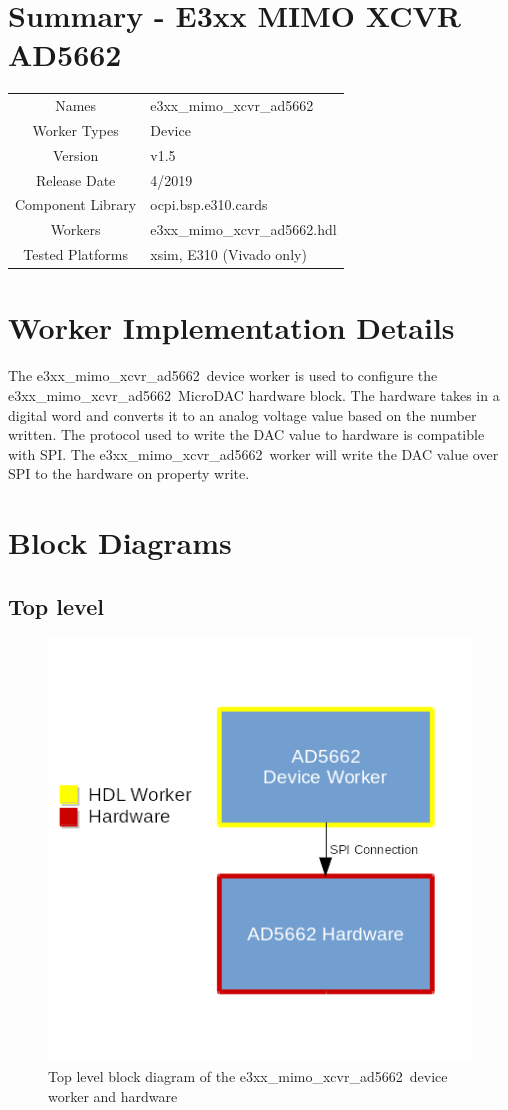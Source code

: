 \documentclass{article}
\author{} %
\date{Version \docVersion} %
\title{\docTitle}
\def\docVersion{1.5}
\def\comp{e3xx\_mimo\_xcvr\_ad5662}
\def\Comp{E3xx MIMO XCVR AD5662}
\def\comp{e3xx\_mimo\_xcvr\_ad5662}
\def\Comp{E3xx MIMO XCVR AD5662}
\begin{document}
\section*{Summary - \Comp}
\begin{tabular}{|c|M{13.5cm}|}
	\hline
	                  &                                      \\
	\hline
	Names              & \comp                        \\
	\hline
	Worker Types       & Device \\
	\hline
	Version           & v\docVersion \\
	\hline
	Release Date      & 4/2019 \\
	\hline
	Component Library & ocpi.bsp.e310.cards \\
	\hline
	Workers           & \comp.hdl                \\
	\hline
	Tested Platforms  & xsim, E310 (Vivado only)                       \\
	\hline
\end{tabular}

\section*{Worker Implementation Details}
The \comp\ device worker is used to configure the \comp\ MicroDAC hardware block. The hardware takes in a digital word and converts it to an analog voltage value based on the number written. The protocol used to write the DAC value to hardware is compatible with SPI. The \comp\ worker will write the DAC value over SPI to the hardware on property write.
\section*{Block Diagrams}
\subsection*{Top level}
\begin{figure}[ht]
	\centerline{\includegraphics[scale=0.75]{top_level_diagram}}
	\caption{Top level block diagram of the \comp\ device worker and hardware}
	\label{fig:tb}
\end{figure}
\flushleft
\end{document}
